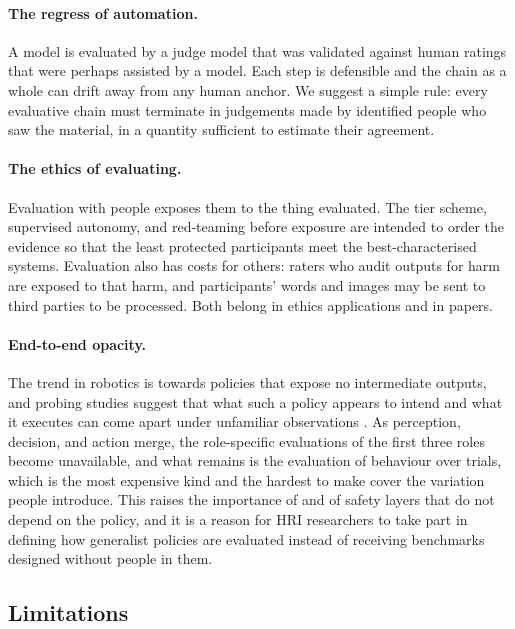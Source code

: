 \paragraph{The regress of automation.} A model is evaluated by a judge model
that was validated against human ratings that were perhaps assisted by a
model. Each step is defensible and the chain as a whole can drift away from
any human anchor. We suggest a simple rule: every evaluative chain must
terminate in judgements made by identified people who saw the material, in a
quantity sufficient to estimate their agreement.

\paragraph{The ethics of evaluating.} Evaluation with people exposes them to
the thing evaluated. The tier scheme, supervised autonomy, and red-teaming
before exposure are intended to order the evidence so that the least
protected participants meet the best-characterised systems. Evaluation also
has costs for others: raters who audit outputs for harm are exposed to that
harm, and participants' words and images may be sent to third parties to be
processed. Both belong in ethics applications and in papers.

\paragraph{End-to-end opacity.} The trend in robotics is towards policies
that expose no intermediate outputs, and probing studies suggest that what
such a policy appears to intend and what it executes can come apart under
unfamiliar observations \cite{fang2025from}. As perception, decision, and action
merge, the role-specific evaluations of the first three roles become
unavailable, and what remains is the evaluation of behaviour over trials,
which is the most expensive kind and the hardest to make cover the variation
people introduce. This raises the importance of  and of
safety layers that do not depend on the policy, and it is a reason for HRI
researchers to take part in defining how generalist policies are evaluated
instead of receiving benchmarks designed without people in them.

\subsection{Limitations}

